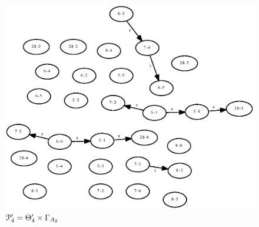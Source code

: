 \documentclass[a4paper,12pt]{article}
\newcommand{\G}{\Gamma }
\newcommand{\cP}{{\cal{P}}}
\numberwithin{equation}{section}
\numberwithin{figure}{section}
\begin{document}
\begin{figure}
\begin{center}
\includegraphics[scale=0.7, bb=0 0 500 410]{python/ex_K_i4-x-g.eps}
\caption{$\cP_4^\prime=\Theta_4^\prime\times \G_{A_2}$}
\label{fig:K_i4-x-g}
\end{center}
\end{figure}
\end{document}
